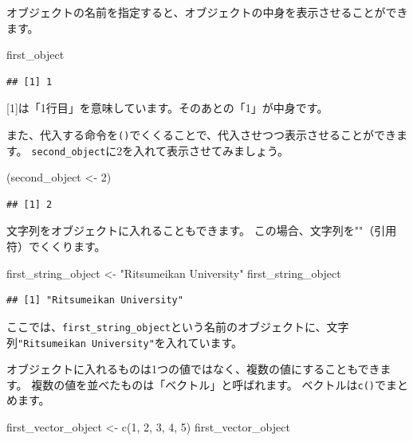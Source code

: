 \documentclass[
]{book}
\newenvironment{Shaded}{\begin{snugshade}}{\end{snugshade}}
\newcommand{\DecValTok}[1]{\textcolor[rgb]{0.00,0.00,0.81}{#1}}
\newcommand{\FunctionTok}[1]{\textcolor[rgb]{0.00,0.00,0.00}{#1}}
\newcommand{\NormalTok}[1]{#1}
\newcommand{\OtherTok}[1]{\textcolor[rgb]{0.56,0.35,0.01}{#1}}
\newcommand{\StringTok}[1]{\textcolor[rgb]{0.31,0.60,0.02}{#1}}
\begin{document}
オブジェクトの名前を指定すると、オブジェクトの中身を表示させることができます。

\begin{Shaded}
\begin{Highlighting}[]
\NormalTok{first\_object}
\end{Highlighting}
\end{Shaded}

\begin{verbatim}
## [1] 1
\end{verbatim}

{[}1{]}は「1行目」を意味しています。そのあとの「1」が中身です。

また、代入する命令を\texttt{()}でくくることで、代入させつつ表示させることができます。
\texttt{second\_object}に2を入れて表示させてみましょう。

\begin{Shaded}
\begin{Highlighting}[]
\NormalTok{(second\_object }\OtherTok{\textless{}{-}} \DecValTok{2}\NormalTok{)}
\end{Highlighting}
\end{Shaded}

\begin{verbatim}
## [1] 2
\end{verbatim}

文字列をオブジェクトに入れることもできます。
この場合、文字列を""（引用符）でくくります。

\begin{Shaded}
\begin{Highlighting}[]
\NormalTok{first\_string\_object }\OtherTok{\textless{}{-}} \StringTok{"Ritsumeikan University"}
\NormalTok{first\_string\_object}
\end{Highlighting}
\end{Shaded}

\begin{verbatim}
## [1] "Ritsumeikan University"
\end{verbatim}

ここでは、\texttt{first\_string\_object}という名前のオブジェクトに、文字列\texttt{"Ritsumeikan\ University"}を入れています。

オブジェクトに入れるものは1つの値ではなく、複数の値にすることもできます。
複数の値を並べたものは「ベクトル」と呼ばれます。
ベクトルは\texttt{c()}でまとめます。

\begin{Shaded}
\begin{Highlighting}[]
\NormalTok{first\_vector\_object }\OtherTok{\textless{}{-}} \FunctionTok{c}\NormalTok{(}\DecValTok{1}\NormalTok{, }\DecValTok{2}\NormalTok{, }\DecValTok{3}\NormalTok{, }\DecValTok{4}\NormalTok{, }\DecValTok{5}\NormalTok{)}
\NormalTok{first\_vector\_object}
\end{Highlighting}
\end{Shaded}
\end{document}
